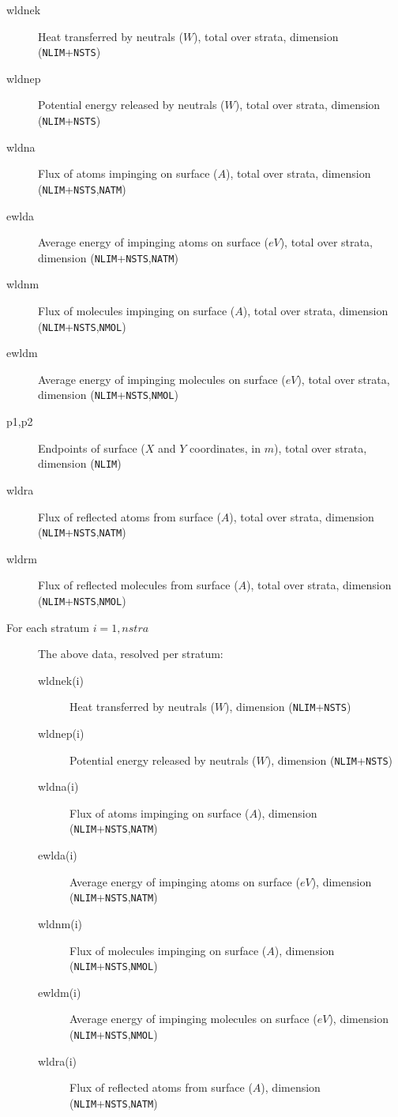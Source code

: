 \documentclass[a4paper,10pt]{report}
\begin{document}
\begin{description}
  \item[wldnek] Heat transferred by neutrals ($W$), total over strata, dimension ({\tt NLIM}+{\tt NSTS})
  \item[wldnep] Potential energy released by neutrals ($W$), total over strata, dimension ({\tt NLIM}+{\tt NSTS})
  \item[wldna] Flux of atoms impinging on surface ($A$), total over strata, dimension ({\tt NLIM}+{\tt NSTS},{\tt NATM})
  \item[ewlda] Average energy of impinging atoms on surface ($eV$), total over strata, dimension ({\tt NLIM}+{\tt NSTS},{\tt NATM})
  \item[wldnm] Flux of molecules impinging on surface ($A$), total over strata, dimension ({\tt NLIM}+{\tt NSTS},{\tt NMOL})
  \item[ewldm] Average energy of impinging molecules on surface ($eV$), total over strata, dimension ({\tt NLIM}+{\tt NSTS},{\tt NMOL})
  \item[p1,p2] Endpoints of surface ($X$ and $Y$ coordinates, in $m$), total over strata, dimension ({\tt NLIM})
  \item[wldra] Flux of reflected atoms from surface ($A$), total over strata, dimension ({\tt NLIM}+{\tt NSTS},{\tt NATM})
  \item[wldrm] Flux of reflected molecules from surface ($A$), total over strata, dimension ({\tt NLIM}+{\tt NSTS},{\tt NMOL})
  \item[For each stratum $i=1,nstra$] The above data, resolved per stratum:
  \begin{description}
    \item[wldnek(i)] Heat transferred by neutrals ($W$), dimension ({\tt NLIM}+{\tt NSTS})
    \item[wldnep(i)] Potential energy released by neutrals ($W$), dimension ({\tt NLIM}+{\tt NSTS})
    \item[wldna(i)] Flux of atoms impinging on surface ($A$), dimension ({\tt NLIM}+{\tt NSTS},{\tt NATM})
    \item[ewlda(i)] Average energy of impinging atoms on surface ($eV$), dimension ({\tt NLIM}+{\tt NSTS},{\tt NATM})
    \item[wldnm(i)] Flux of molecules impinging on surface ($A$), dimension ({\tt NLIM}+{\tt NSTS},{\tt NMOL})
    \item[ewldm(i)] Average energy of impinging molecules on surface ($eV$), dimension ({\tt NLIM}+{\tt NSTS},{\tt NMOL})
    \item[wldra(i)] Flux of reflected atoms from surface ($A$), dimension ({\tt NLIM}+{\tt NSTS},{\tt NATM})

\end{description}
\end{description}
\end{document}

